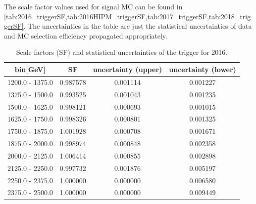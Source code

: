 The scale factor values used for signal MC can be found in \cref{tab:2016_triggerSF,tab:2016HIPM_triggerSF,tab:2017_triggerSF,tab:2018_triggerSF}. The uncertainties in the table are just the statistical uncertainties of data and MC selection efficiency propagated appropriately.


\begin{table}
	\centering
	\caption{Scale factors (SF) and statistical uncertainties of the \HT trigger for 2016.}
	\label{tab:2016_triggerSF}
	\begin{tabular}{cccc}
		\hline
		\HT bin[GeV]    & SF       & uncertainty (upper) & uncertainty (lower) \\
		\hline
		1200.0 - 1375.0 & 0.987578 & 0.001114            & 0.001227            \\
		1375.0 - 1500.0 & 0.993525 & 0.001043            & 0.001235            \\
		1500.0 - 1625.0 & 0.998121 & 0.000693            & 0.001015            \\
		1625.0 - 1750.0 & 0.998326 & 0.000801            & 0.001325            \\
		1750.0 - 1875.0 & 1.001928 & 0.000708            & 0.001671            \\
		1875.0 - 2000.0 & 0.998974 & 0.000848            & 0.002358            \\
		2000.0 - 2125.0 & 1.006414 & 0.000855            & 0.002898            \\
		2125.0 - 2250.0 & 0.997732 & 0.001876            & 0.005197            \\
		2250.0 - 2375.0 & 1.000000 & 0.000000            & 0.006580            \\
		2375.0 - 2500.0 & 1.000000 & 0.000000            & 0.009449            \\
		\hline
	\end{tabular}
\end{table}

